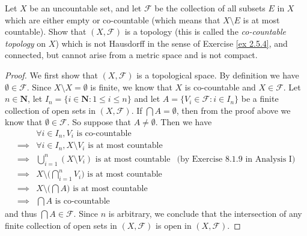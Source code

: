 \begin{exercise}\label{ex 2.5.7}
    Let \(X\) be an uncountable set, and let \(\mathcal{F}\) be the collection of all subsets \(E\) in \(X\) which are either empty or co-countable
    (which means that \(X \setminus E\) is at most countable).
    Show that \((X, \mathcal{F})\) is a topology (this is called the \emph{co-countable topology} on \(X\)) which is not Hausdorff in the sense of Exercise \ref{ex 2.5.4}, and connected, but cannot arise from a metric space and is not compact.
\end{exercise}

\begin{proof}
    We first show that \((X, \mathcal{F})\) is a topological space.
    By definition we have \(\emptyset \in \mathcal{F}\).
    Since \(X \setminus X = \emptyset\) is finite, we know that \(X\) is co-countable and \(X \in \mathcal{F}\).
    Let \(n \in \mathbf{N}\), let \(I_n = \{i \in \mathbf{N} : 1 \leq i \leq n\}\) and let \(A = \{V_i \in \mathcal{F} : i \in I_n\}\) be a finite collection of open sets in \((X, \mathcal{F})\).
    If \(\bigcap A = \emptyset\), then from the proof above we know that \(\emptyset \in \mathcal{F}\).
    So suppose that \(A \neq \emptyset\).
    Then we have
    \begin{align*}
                 & \forall i \in I_n, V_i \text{ is co-countable}                                                                        \\
        \implies & \forall i \in I_n, X \setminus V_i \text{ is at most countable}                                                       \\
        \implies & \bigcup_{i = 1}^n (X \setminus V_i) \text{ is at most countable}           & \text{(by Exercise 8.1.9 in Analysis I)} \\
        \implies & X \setminus \bigg(\bigcap_{i = 1}^n V_i\bigg) \text{ is at most countable}                                            \\
        \implies & X \setminus \bigg(\bigcap A\bigg) \text{ is at most countable}                                                        \\
        \implies & \bigcap A \text{ is co-countable}
    \end{align*}
    and thus \(\bigcap A \in \mathcal{F}\).
    Since \(n\) is arbitrary, we conclude that the intersection of any finite collection of open sets in \((X, \mathcal{F})\) is open in \((X, \mathcal{F})\).


\end{proof}
